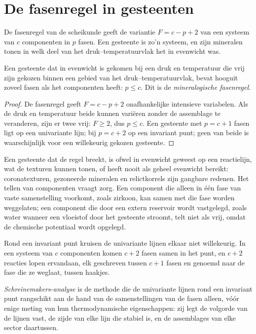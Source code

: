 \section{De fasenregel in gesteenten}\label{sec:b3:petrological-thermodynamics:phase-rule}

De fasenregel van de scheikunde geeft de variantie $F = c - p + 2$ van een systeem van
$c$ componenten in $p$ fasen. Een gesteente is zo'n systeem, en zijn mineralen tonen
in welk deel van het druk--temperatuurvlak het in evenwicht was.

\begin{proposition}\label{prop:b3:petrological-thermodynamics:goldschmidt}
Een gesteente dat in evenwicht is gekomen bij een druk en temperatuur die vrij zijn gekozen
binnen een gebied van het druk--temperatuurvlak, bevat hooguit zoveel fasen als het
componenten heeft: $p \le c$. Dit is de
\emph{mineralogische fasenregel}.
\end{proposition}

\begin{proof}
De fasenregel geeft $F = c - p + 2$ onafhankelijke intensieve variabelen. Als de
druk en temperatuur beide kunnen variëren zonder de assemblage te veranderen, zijn er twee
vrij: $F \ge 2$, dus $p \le c$. Een gesteente met $p = c + 1$ fasen ligt
op een univariante lijn; bij $p = c + 2$ op een invariant punt; geen van beide is
waarschijnlijk voor een willekeurig gekozen gesteente.
\end{proof}

Een gesteente dat de regel breekt, is ofwel in evenwicht geweest op een reactielijn, wat de
texturen kunnen tonen, of heeft nooit als geheel evenwicht bereikt: coronatexturen,
gezoneerde mineralen en relictkorrels zijn gangbare redenen. Het tellen van componenten
vraagt zorg. Een component die alleen in één fase van vaste samenstelling voorkomt, zoals
zirkoon, kan samen met die fase worden weggelaten; een component die door een extern
reservoir wordt vastgelegd, zoals water wanneer een vloeistof door het gesteente stroomt, telt
niet als vrij, omdat de chemische potentiaal wordt opgelegd.

Rond een invariant punt kruisen de univariante lijnen elkaar niet willekeurig. In een
systeem van $c$ componenten komen $c + 2$ fasen samen in het punt, en $c + 2$
reacties lopen ervandaan, elk geschreven tussen $c + 1$ fasen en genoemd naar de fase die
ze weglaat, tussen haakjes.

\begin{definition}\label{def:b3:petrological-thermodynamics:schreinemakers}
\emph{Schreinemakers-analyse} is de methode
die de univariante lijnen rond een invariant punt rangschikt aan de hand van de
samenstellingen van de fasen alleen, vóór enige meting van hun
thermodynamische eigenschappen: zij legt de volgorde van de lijnen vast, de zijde van elke
lijn die stabiel is, en de assemblages van elke sector daartussen.
\end{definition}

